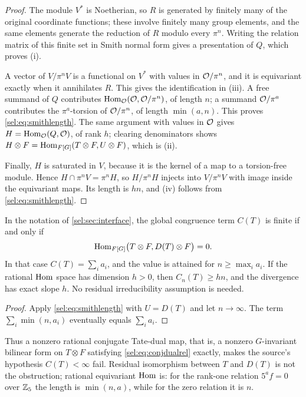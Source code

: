 \begin{proof}
The module $V^*$ is Noetherian, so $R$ is generated by finitely many of the
original coordinate functions; these involve finitely many group elements,
and the same elements generate the reduction of $R$ modulo every $\pi^n$.
Writing the relation matrix of this finite set in Smith normal form gives a
presentation of $Q$, which proves (i).

A vector of $V/\pi^nV$ is a functional on $V^*$ with values in
$\mathcal{O}/\pi^n$, and it is equivariant exactly when it annihilates $R$. This
gives the identification in (iii). A free summand of $Q$ contributes
$\operatorname{Hom}_{\mathcal{O}}(\mathcal{O},\mathcal{O}/\pi^n)$, of length $n$; a summand $\mathcal{O}/\pi^a$ contributes
the $\pi^a$-torsion of $\mathcal{O}/\pi^n$, of length $\min(a,n)$. This proves
\eqref{sel:eq:smithlength}. The same argument with values in $\mathcal{O}$ gives
$H=\operatorname{Hom}_{\mathcal{O}}(Q,\mathcal{O})$, of rank $h$; clearing denominators shows
$H\otimes F=\operatorname{Hom}_{F[G]}(T\otimes F,U\otimes F)$, which is (ii).

Finally, $H$ is saturated in $V$, because it is the kernel of a map to a
torsion-free module. Hence $H\cap\pi^nV=\pi^nH$, so $H/\pi^nH$ injects into
$V/\pi^nV$ with image inside the equivariant maps. Its length is $hn$, and
(iv) follows from \eqref{sel:eq:smithlength}.
\end{proof}

\begin{corollary}\label{sel:cor:finiteness}
In the notation of \cref{sel:sec:interface}, the global congruence term
$C(T)$ is finite if and only if
\[
 \operatorname{Hom}_{F[G]}\bigl(T\otimes F,D(T)\otimes F\bigr)=0 .
\]
In that case $C(T)=\sum_ia_i$, and the value is attained for
$n\ge\max_ia_i$. If the rational $\operatorname{Hom}$ space has dimension $h>0$, then
$C_n(T)\ge hn$, and the divergence has exact slope $h$. No residual
irreducibility assumption is needed.
\end{corollary}

\begin{proof}
Apply \eqref{sel:eq:smithlength} with $U=D(T)$ and let $n\to\infty$. The
term $\sum_i\min(n,a_i)$ eventually equals $\sum_ia_i$.
\end{proof}

Thus a nonzero rational conjugate Tate-dual map, that is, a nonzero
$G$-invariant bilinear form on $T\otimes F$ satisfying
\eqref{sel:eq:conjdualrel} exactly, makes the source's 
hypothesis $C(T)<\infty$ fail. Residual isomorphism between $T$ and $D(T)$
is not the obstruction; rational equivariant $\operatorname{Hom}$ is: for the rank-one
relation $5^af=0$ over $\mathbb{Z}_5$ the length is $\min(n,a)$, while for the zero
relation it is $n$.

